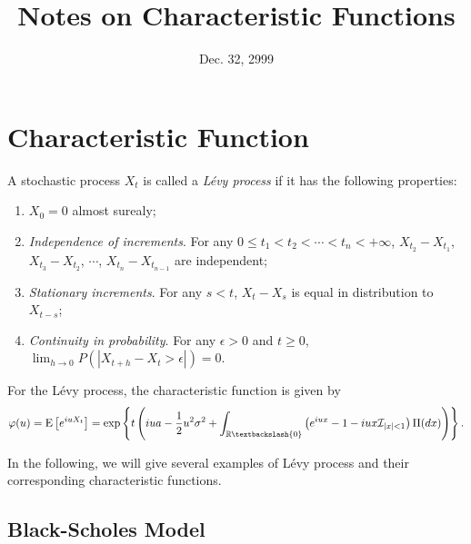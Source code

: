 \documentclass[12pt]{article}
\begin{document}
\title{Notes on Characteristic Functions}
\date{Dec. 32, 2999}

\maketitle

\section{Characteristic Function}

  A stochastic process $X_t$ is called a {\it L\'{e}vy process} if it has the following properties:
  \begin{enumerate}[noitemsep]
    \item $X_0=0$ almost surealy;
    \item {\it Independence of increments}. For any $0\le t_1 < t_2 < \cdots < t_n < +\infty$, $X_{t_2}-X_{t_1}$,
          $X_{t_3}-X_{t_2}$, $\cdots$, $X_{t_n}-X_{t_{n-1}}$ are independent;
    \item {\it Stationary increments}. For any $s<t$, $X_t-X_s$ is equal in distribution to $X_{t-s}$;
    \item {\it Continuity in probability}. For any $\epsilon>0$ and $t\ge 0$, $\lim_{h\rightarrow 0}P(|X_{t+h}-X_t>\epsilon|)=0$.
  \end{enumerate}
  For the L\'{e}vy process, the characteristic function is given by
  \begin{equation}
    \varphi(u)={\rm E}\left[e^{iuX_t}\right]=\exp\left\{t\left(iua-\frac{1}{2}u^2\sigma^2
              +\int_{\mathbb{R}\textbackslash\{0\}}\left(e^{iux}-1-iux\mathcal{I}_{|x|<1}\right)\Pi(dx)\right)\right\}.
    \label{char}
  \end{equation}

  In the following, we will give several examples of L\'{e}vy process and their corresponding characteristic functions.

  \subsection{Black-Scholes Model}
\end{document}

